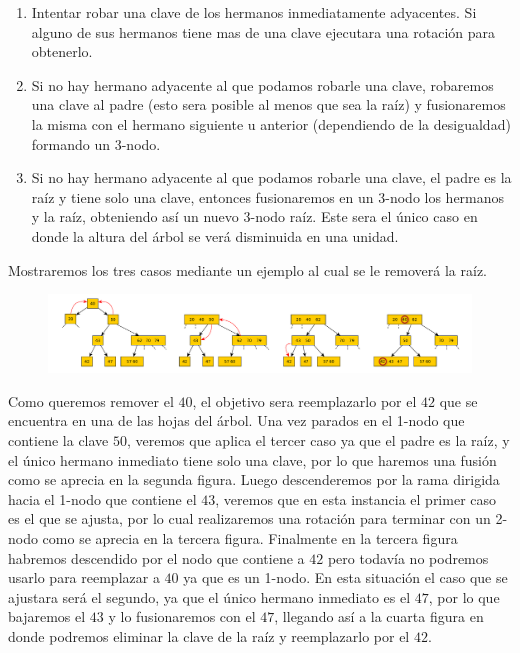 \begin{enumerate}
 \item Intentar robar una clave de los hermanos inmediatamente adyacentes. Si alguno de sus hermanos tiene mas de una clave ejecutara una rotaci\'on para obtenerlo.
 \item Si no hay hermano adyacente al que podamos robarle una clave, robaremos una clave al padre (esto sera posible al menos que sea la ra\'iz) y fusionaremos la misma con el hermano siguiente u anterior (dependiendo de la desigualdad) formando un 3-nodo.
 \item Si no hay hermano adyacente al que podamos robarle una clave, el padre es la ra\'iz y tiene solo una clave, entonces fusionaremos en un 3-nodo los hermanos y la ra\'iz, obteniendo as\'i un nuevo 3-nodo ra\'iz. Este sera el \'unico caso en donde la altura del \'arbol se ver\'a disminuida en una unidad.
\end{enumerate}

Mostraremos los tres casos mediante un ejemplo al cual se le remover\'a la ra\'iz.

\begin{figure}
 \centering
 \includegraphics[width=1\textwidth]{graficos/EliminacionArboles234.pdf}
\end{figure}

Como queremos remover el $40$, el objetivo sera reemplazarlo por el $42$ que se encuentra en una de las hojas del \'arbol. Una vez parados en el 1-nodo que contiene la clave $50$, veremos que aplica el tercer caso ya que el padre es la ra\'iz, y el \'unico hermano inmediato tiene solo una clave, por lo que haremos una fusi\'on como se aprecia en la segunda figura. Luego descenderemos por la rama dirigida hacia el 1-nodo que contiene el $43$, veremos que en esta instancia el primer caso es el que se ajusta, por lo cual realizaremos una rotaci\'on para terminar con un 2-nodo como se aprecia en la tercera figura. Finalmente en la tercera figura habremos descendido por el nodo que contiene a $42$ pero todav\'ia no podremos usarlo para reemplazar a $40$ ya que es un 1-nodo. En esta situaci\'on el caso que se ajustara ser\'a el segundo, ya que el \'unico hermano inmediato es el $47$, por lo que bajaremos el $43$ y lo fusionaremos con el $47$, llegando as\'i a la cuarta figura en donde podremos eliminar la clave de 
la ra\'iz y 
reemplazarlo por el $42$.

